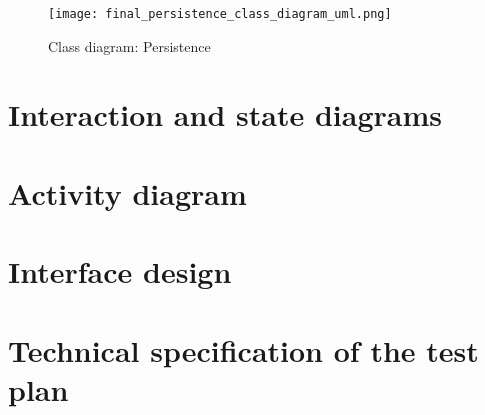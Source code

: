 \begin{figure}[H]
    \caption{Class diagram: Persistence}
  \centering
  \texttt{[image: final\_persistence\_class\_diagram\_uml.png]}
\end{figure}



\section{Interaction and state diagrams}

\section{Activity diagram}

\section{Interface design}

\section{Technical specification of the test plan}

